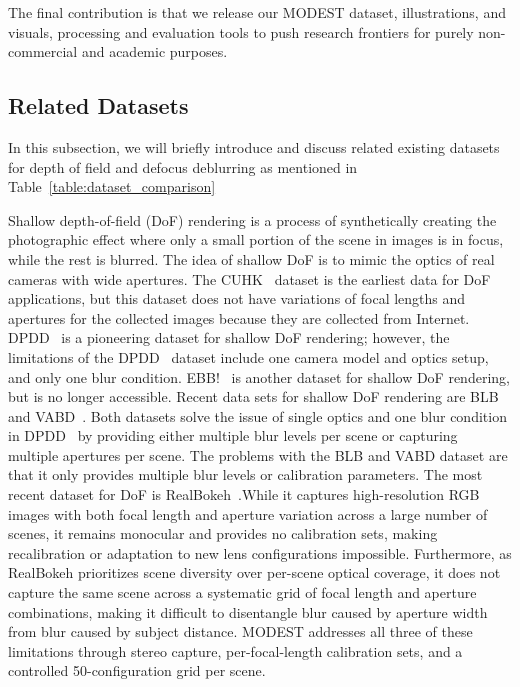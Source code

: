 The final contribution is that we release our MODEST dataset, illustrations, and visuals, processing and evaluation tools to push research frontiers for purely non-commercial and academic purposes.





\subsection{Related Datasets}\label{subsec:related_datasets}

In this subsection, we will briefly introduce and discuss related existing datasets for depth of field and defocus deblurring as mentioned in 
Table~\ref{table:dataset_comparison}


Shallow depth-of-field (DoF) rendering is a process of synthetically creating the photographic effect where only a small portion of the scene in images is in focus, while the rest is blurred. The idea of shallow DoF is to mimic the optics of real cameras with wide apertures. The CUHK~\cite{Shi2014BlurDetection} dataset is the earliest data for DoF applications, but this dataset does not have variations of focal lengths and apertures for the collected images because they are collected from Internet. DPDD~\cite{abuolaim2019dpdd} is a pioneering dataset for shallow DoF rendering; however, the limitations of the DPDD~\cite{abuolaim2019dpdd} dataset include one camera model and optics setup, and only one blur condition. EBB!~\cite{ignatov2020rendering} is another dataset for shallow DoF rendering, but is no longer accessible. Recent data sets for shallow DoF rendering are BLB~\cite{zheng2022blur} and VABD~\cite{huang2024vabd}. Both datasets solve the issue of single optics and one blur condition in DPDD~\cite{abuolaim2019dpdd} by providing either multiple blur levels per scene or capturing multiple apertures per scene. The problems with the BLB and VABD dataset are that it only provides multiple blur levels or calibration parameters. The most recent dataset for DoF is RealBokeh~\cite{seizinger2025bokehlicious}.While it captures high-resolution RGB images with both focal length and aperture variation across a large number of scenes, it remains monocular and provides no calibration sets, making recalibration or adaptation to new lens configurations impossible. Furthermore, as RealBokeh prioritizes scene diversity over per-scene optical coverage, it does not capture the same scene across a systematic grid of focal length and aperture combinations, making it difficult to disentangle blur caused by aperture width from blur caused by subject distance. MODEST addresses all three of these limitations through stereo capture, per-focal-length calibration sets, and a controlled 50-configuration grid per scene.

